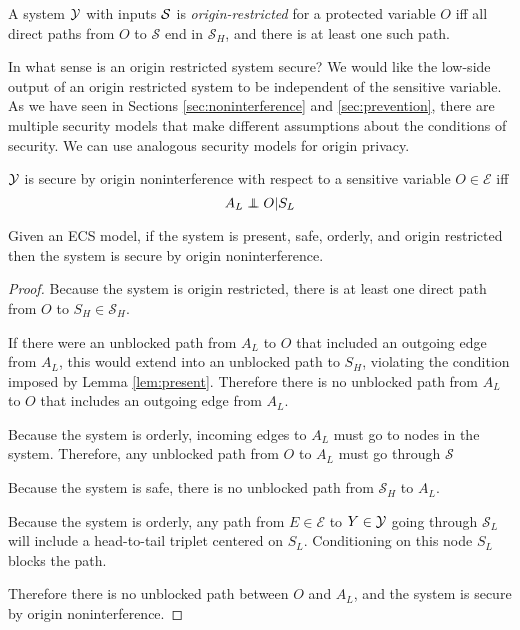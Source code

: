 \documentclass[../thesis.tex]{subfiles}
\begin{document}
\begin{dfn}
  A system $\mathcal{Y}$ with inputs $\mathcal{S}$ 
  is \emph{origin-restricted} for a protected
  variable $O$ iff all direct paths from $O$ to $\mathcal{S}$
  end in $\mathcal{S}_H$, and there is at least one such path.
\end{dfn}

In what sense is an origin restricted system secure?
We would like the low-side output of an origin restricted
system to be independent of the sensitive variable.
As we have seen in Sections \ref{sec:noninterference}
and \ref{sec:prevention}, there are multiple security
models that make different assumptions about the
conditions of security.
We can use analogous security models for origin privacy.

\begin{dfn}
  $\mathcal{Y}$ is secure by origin noninterference with respect
  to a sensitive variable $O \in \mathcal{E}$ iff
  $$A_L \independent O \vert S_L$$
\end{dfn}

\begin{thm}
  \label{thm:origin-noninterference}
  Given an ECS model,
  if the system is present, safe, orderly,
  and origin restricted
  then the system
  is secure by origin noninterference.
\end{thm}

\begin{proof}
  Because the system is origin restricted,
  there is at least one direct path from $O$
  to $S_H \in \mathcal{S}_H$.

  If there were an unblocked path from $A_L$
  to $O$ that included an outgoing edge from $A_L$,
  this would extend into an unblocked path to $S_H$,
  violating the condition imposed by Lemma \ref{lem:present}.
  Therefore there is no unblocked path from $A_L$
  to $O$ that includes an outgoing edge from $A_L$.

  Because the system is orderly, incoming edges
  to $A_L$ must go to nodes in the system.
  Therefore, any unblocked path from $O$
  to $A_L$ must go through $\mathcal{S}$
  

  Because the system is safe, there is no unblocked
  path from $\mathcal{S}_H$ to $A_L$.

  Because the system is orderly, any path from $E \in \mathcal{E}$
  to $Y \in \mathcal{Y}$ going through $\mathcal{S}_L$ will
  include a head-to-tail triplet centered on $S_L$.
  Conditioning on this node $S_L$ blocks the path.

  Therefore there is no unblocked path between $O$
  and $A_L$, and the system is secure by origin noninterference.
\end{proof}
\end{document}
